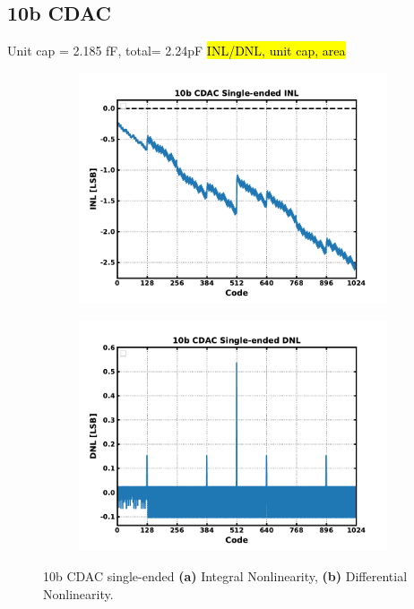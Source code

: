 \subsection{10b CDAC}
	Unit cap = 2.185 fF, total= 2.24pF
	\hl{INL/DNL, unit cap, area}

	\begin{figure}[htb!]
	    \centering
	    \begin{subfigure}{0.5\textwidth}
	        \centering
	        \includegraphics[width=1\textwidth, angle=0]{./figs/results/10b_cdac_se_inl}
	        \caption{ }
	        \label{fig:10b_cdac_se_inl}
	    \end{subfigure}%
	    \begin{subfigure}{0.5\textwidth}
	        \centering
	        \includegraphics[width=1\textwidth, angle=0]{./figs/results/10b_cdac_se_dnl}
	        \caption{ }
	        \label{fig:10b_cdac_se_dnl}
	    \end{subfigure}
	    \label{fig:10b_cdac_se_nonlinearity}
	    \caption{10b CDAC single-ended \textbf{(a)} Integral Nonlinearity, \textbf{(b)} Differential Nonlinearity.}
	\end{figure} 




